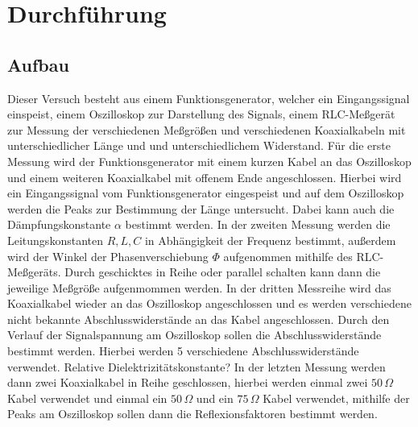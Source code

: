 \section{Durchführung}
\label{sec:Durchführung}

\subsection{Aufbau}
Dieser Versuch besteht aus einem Funktionsgenerator, welcher ein Eingangssignal einspeist, einem Oszilloskop zur Darstellung des Signals, einem RLC-Meßgerät zur Messung der verschiedenen Meßgrößen und verschiedenen Koaxialkabeln mit unterschiedlicher Länge und und unterschiedlichem Widerstand. 
Für die erste Messung wird der Funktionsgenerator mit einem kurzen Kabel an das Oszilloskop und einem weiteren Koaxialkabel mit offenem Ende angeschlossen. Hierbei wird ein Eingangssignal vom Funktionsgenerator eingespeist und auf dem Oszilloskop werden die Peaks zur Bestimmung der Länge untersucht. Dabei kann auch die Dämpfungskonstante $\alpha$ bestimmt werden.
In der zweiten Messung werden die Leitungskonstanten $R, L, C$  in Abhängigkeit der Frequenz bestimmt, außerdem wird der Winkel der Phasenverschiebung $\Phi$ aufgenommen mithilfe des RLC-Meßgeräts. Durch geschicktes in Reihe oder parallel schalten kann dann die jeweilige Meßgröße aufgenmommen werden. 
In der dritten Messreihe wird das Koaxialkabel wieder an das Oszilloskop angeschlossen und es werden verschiedene nicht bekannte Abschlusswiderstände an das Kabel angeschlossen. Durch den Verlauf der Signalspannung am Oszilloskop sollen die Abschlusswiderstände bestimmt werden. Hierbei werden 5 verschiedene Abschlusswiderstände verwendet. Relative Dielektrizitätskonstante?
In der letzten Messung werden dann zwei Koaxialkabel in Reihe geschlossen, hierbei werden einmal zwei $50\,\Omega$ Kabel verwendet und einmal ein $50\,\Omega$ und ein $75\,\Omega$ Kabel verwendet, mithilfe der Peaks am Oszilloskop sollen dann die Reflexionsfaktoren bestimmt werden.

\clearpage